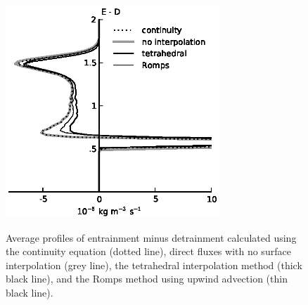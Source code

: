 \documentclass[12pt]{article}
\begin{document}
\begin{figure}[t]
  \noindent
  \includegraphics[width=19pc,angle=0]{./figures/E_minus_D}\\
  \caption{Average profiles of entrainment minus detrainment calculated using 
  the continuity equation (dotted line), direct fluxes with no surface 
  interpolation (grey line), the tetrahedral interpolation method (thick black 
  line), and the Romps method using upwind advection (thin black line).
  }\label{fig:E_minus_D}
\end{figure}
\end{document}
